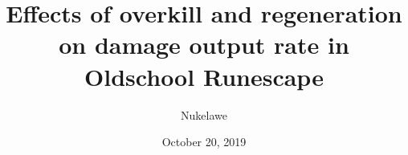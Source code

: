 

\title{Effects of overkill and regeneration on damage output rate in Oldschool Runescape}
\author{Nukelawe}
\date{October 20, 2019}
\maketitle






%
\pagebreak
\pagebreak


%


